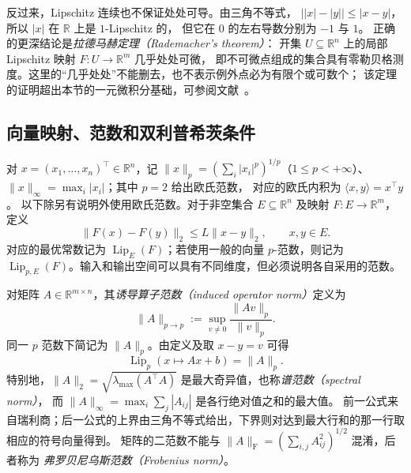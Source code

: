 \documentclass[UTF8,12pt,a4paper,fontset=fandol]{ctexart}
\begin{document}
反过来，Lipschitz 连续也不保证处处可导。由三角不等式，
$\bigl||x|-|y|\bigr|\le|x-y|$，所以 $|x|$ 在 $\mathbb R$ 上是 $1$-Lipschitz 的，
但它在 $0$ 的左右导数分别为 $-1$ 与 $1$。
正确的更深结论是\emph{拉德马赫定理（Rademacher's theorem）}：
开集 $U\subseteq\mathbb R^n$ 上的局部 Lipschitz 映射 $F:U\to\mathbb R^m$ 几乎处处可微，
即不可微点组成的集合具有零勒贝格测度。这里的“几乎处处”不能删去，也不表示例外点必为有限个或可数个；
该定理的证明超出本节的一元微积分基础，可参阅文献~\cite{rademacher-notes}。

\subsection{向量映射、范数和双利普希茨条件}
\label{subsec:lip-vector}

对 $x=(x_1,\ldots,x_n)^\top\in\mathbb R^n$，记
$\|x\|_p=(\sum_i|x_i|^p)^{1/p}$（$1\le p<+\infty$）、
$\|x\|_\infty=\max_i|x_i|$；其中 $p=2$ 给出欧氏范数，
对应的欧氏内积为 $\langle x,y\rangle=x^\top y$。
以下除另有说明外使用欧氏范数。对于非空集合 $E\subseteq\mathbb R^n$ 及映射
$F:E\to\mathbb R^m$，定义
\begin{equation}\label{eq:lip-vector}
  \|F(x)-F(y)\|_2\le L\|x-y\|_2,\qquad x,y\in E.
\end{equation}
对应的最优常数记为 $\operatorname{Lip}_E(F)$；若使用一般的向量 $p$-范数，则记为
$\operatorname{Lip}_{p,E}(F)$。输入和输出空间可以具有不同维度，但必须说明各自采用的范数。

对矩阵 $A\in\mathbb R^{m\times n}$，其\emph{诱导算子范数（induced operator norm）}定义为
\[
  \|A\|_{p\to p}:=\sup_{v\ne0}\frac{\|Av\|_p}{\|v\|_p}.
\]
同一 $p$ 范数下简记为 $\|A\|_p$。由定义及取 $x-y=v$ 可得
\begin{equation}\label{eq:lip-affine}
  \operatorname{Lip}_p(x\mapsto Ax+b)=\|A\|_p.
\end{equation}
特别地，$\|A\|_2=\sqrt{\lambda_{\max}(A^\top A)}$ 是最大奇异值，也称\emph{谱范数（spectral norm）}，
而 $\|A\|_\infty=\max_i\sum_j|A_{ij}|$ 是各行绝对值之和的最大值。
前一公式来自瑞利商；后一公式的上界由三角不等式给出，下界则对达到最大行和的那一行取相应的符号向量得到。
矩阵的二范数不能与 $\|A\|_{\mathrm F}=(\sum_{i,j}A_{ij}^2)^{1/2}$ 混淆，后者称为
\emph{弗罗贝尼乌斯范数（Frobenius norm）}。
\end{document}
